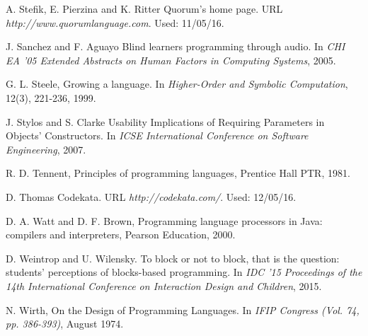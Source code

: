 \documentclass[preprint,10pt]{sigplanconf}
\begin{document}
\begin{thebibliography}{}
A. Stefik, E. Pierzina and K. Ritter \newblock Quorum's home page. \newblock URL \emph{http://www.quorumlanguage.com}. \newblock Used: 11/05/16.

J. Sanchez and F. Aguayo \newblock Blind learners programming through audio. \newblock In \emph{CHI EA '05 Extended Abstracts on Human Factors in Computing Systems}, 2005.

G. L. Steele, \newblock Growing a language. \newblock In \emph{Higher-Order and Symbolic Computation}, 12(3), 221-236, 1999.

J. Stylos and S. Clarke \newblock Usability Implications of Requiring Parameters in Objects' Constructors. \newblock In \emph{ICSE International Conference on Software Engineering}, 2007.

R. D. Tennent, \newblock Principles of programming languages, \newblock Prentice Hall PTR, 1981.

D. Thomas \newblock Codekata. \newblock URL \emph{http://codekata.com/}. \newblock Used: 12/05/16.

D. A. Watt and D. F. Brown, \newblock Programming language processors in Java: compilers and interpreters, \newblock Pearson Education, 2000.

D. Weintrop and U. Wilensky. \newblock To block or not to block, that is the question: students' perceptions of blocks-based programming. \newblock In \emph{IDC '15 Proceedings of the 14th International Conference on Interaction Design and Children}, 2015.

N. Wirth, \newblock On the Design of Programming Languages. \newblock In \emph{IFIP Congress (Vol. 74, pp. 386-393)}, August 1974.





\end{thebibliography}
\end{document}
